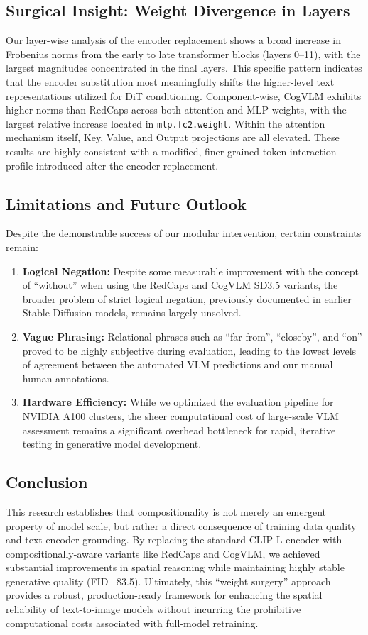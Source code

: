 \subsection{Surgical Insight: Weight Divergence in Layers}
Our layer-wise analysis of the encoder replacement shows a broad increase in Frobenius norms from the early to late transformer blocks (layers 0--11), with the largest magnitudes concentrated in the final layers. This specific pattern indicates that the encoder substitution most meaningfully shifts the higher-level text representations utilized for DiT conditioning. Component-wise, CogVLM exhibits higher norms than RedCaps across both attention and MLP weights, with the largest relative increase located in \texttt{mlp.fc2.weight}. Within the attention mechanism itself, Key, Value, and Output projections are all elevated. These results are highly consistent with a modified, finer-grained token-interaction profile introduced after the encoder replacement.

\subsection{Limitations and Future Outlook}
Despite the demonstrable success of our modular intervention, certain constraints remain:

\begin{enumerate}
    \item \textbf{Logical Negation:} Despite some measurable improvement with the concept of ``without'' when using the RedCaps and CogVLM SD3.5 variants, the broader problem of strict logical negation, previously documented in earlier Stable Diffusion models, remains largely unsolved.
    \item \textbf{Vague Phrasing:} Relational phrases such as ``far from'', ``closeby'', and ``on'' proved to be highly subjective during evaluation, leading to the lowest levels of agreement between the automated VLM predictions and our manual human annotations.
    \item \textbf{Hardware Efficiency:} While we optimized the evaluation pipeline for NVIDIA A100 clusters, the sheer computational cost of large-scale VLM assessment remains a significant overhead bottleneck for rapid, iterative testing in generative model development.
\end{enumerate}

\subsection{Conclusion}
This research establishes that compositionality is not merely an emergent property of model scale, but rather a direct consequence of training data quality and text-encoder grounding. By replacing the standard CLIP-L encoder with compositionally-aware variants like RedCaps and CogVLM, we achieved substantial improvements in spatial reasoning while maintaining highly stable generative quality (FID ~83.5). Ultimately, this ``weight surgery'' approach provides a robust, production-ready framework for enhancing the spatial reliability of text-to-image models without incurring the prohibitive computational costs associated with full-model retraining.